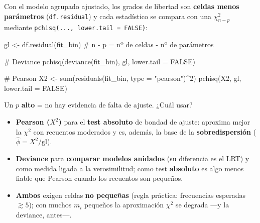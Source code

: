 \documentclass[
  letterpaper,
  DIV=11,
  numbers=noendperiod]{scrartcl}
\newenvironment{Shaded}{\begin{snugshade}}{\end{snugshade}}
\newcommand{\AttributeTok}[1]{\textcolor[rgb]{0.40,0.45,0.13}{#1}}
\newcommand{\CommentTok}[1]{\textcolor[rgb]{0.37,0.37,0.37}{#1}}
\newcommand{\ConstantTok}[1]{\textcolor[rgb]{0.56,0.35,0.01}{#1}}
\newcommand{\DecValTok}[1]{\textcolor[rgb]{0.68,0.00,0.00}{#1}}
\newcommand{\FunctionTok}[1]{\textcolor[rgb]{0.28,0.35,0.67}{#1}}
\newcommand{\NormalTok}[1]{\textcolor[rgb]{0.00,0.23,0.31}{#1}}
\newcommand{\OtherTok}[1]{\textcolor[rgb]{0.00,0.23,0.31}{#1}}
\newcommand{\SpecialCharTok}[1]{\textcolor[rgb]{0.37,0.37,0.37}{#1}}
\newcommand{\StringTok}[1]{\textcolor[rgb]{0.13,0.47,0.30}{#1}}
\providecommand{\tightlist}{%
  \setlength{\itemsep}{0pt}\setlength{\parskip}{0pt}}\usepackage{longtable,booktabs,array}
\begin{document}
\begin{tcolorbox}[enhanced jigsaw, breakable, colframe=quarto-callout-tip-color-frame, left=2mm, arc=.35mm, colbacktitle=quarto-callout-tip-color!10!white, toprule=.15mm, colback=white, coltitle=black, rightrule=.15mm, opacitybacktitle=0.6, title=\textcolor{quarto-callout-tip-color}{\faLightbulb}\hspace{0.5em}{🔧 En R. El contraste χ² de bondad de ajuste (deviance y Pearson)}, titlerule=0mm, toptitle=1mm, bottomtitle=1mm, leftrule=.75mm, bottomrule=.15mm, opacityback=0]

Con el modelo agrupado ajustado, los grados de libertad son
\textbf{celdas menos parámetros} (\texttt{df.residual}) y cada
estadístico se compara con una \(\chi^2_{n-p}\) mediante
\texttt{pchisq(...,\ lower.tail\ =\ FALSE)}:

\begin{Shaded}
\begin{Highlighting}[]
\NormalTok{gl }\OtherTok{\textless{}{-}} \FunctionTok{df.residual}\NormalTok{(fit\_bin)                       }\CommentTok{\# n {-} p = nº de celdas {-} nº de parámetros}

\CommentTok{\# Deviance}
\FunctionTok{pchisq}\NormalTok{(}\FunctionTok{deviance}\NormalTok{(fit\_bin), gl, }\AttributeTok{lower.tail =} \ConstantTok{FALSE}\NormalTok{)}

\CommentTok{\# Pearson}
\NormalTok{X2 }\OtherTok{\textless{}{-}} \FunctionTok{sum}\NormalTok{(}\FunctionTok{residuals}\NormalTok{(fit\_bin, }\AttributeTok{type =} \StringTok{"pearson"}\NormalTok{)}\SpecialCharTok{\^{}}\DecValTok{2}\NormalTok{)}
\FunctionTok{pchisq}\NormalTok{(X2, gl, }\AttributeTok{lower.tail =} \ConstantTok{FALSE}\NormalTok{)}
\end{Highlighting}
\end{Shaded}

Un \(p\) \textbf{alto} = no hay evidencia de falta de ajuste. ¿Cuál
usar?

\begin{itemize}
\tightlist
\item
  \textbf{Pearson (\(X^2\))} para el \textbf{test absoluto} de bondad de
  ajuste: aproxima mejor la \(\chi^2\) con recuentos moderados y es,
  además, la base de la \textbf{sobredispersión}
  (\(\hat\phi = X^2/\text{gl}\)).
\item
  \textbf{Deviance} para \textbf{comparar modelos anidados} (su
  diferencia es el LRT) y como medida ligada a la verosimilitud; como
  test \textbf{absoluto} es algo menos fiable que Pearson cuando los
  recuentos son pequeños.
\item
  \textbf{Ambos} exigen celdas \textbf{no pequeñas} (regla práctica:
  frecuencias esperadas \(\gtrsim 5\)); con muchos \(m_i\) pequeños la
  aproximación \(\chi^2\) se degrada ---y la deviance, antes---.
\end{itemize}

\end{tcolorbox}
\end{document}
